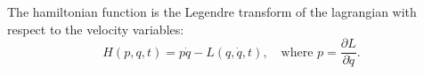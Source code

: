 The hamiltonian function is the Legendre transform of the lagrangian with respect to the velocity variables:
$$H(p, q, t) = p\dot{q} - L(q, \dot{q}, t), \quad \text{where } p = \frac{\partial L}{\partial \dot{q}}.$$
